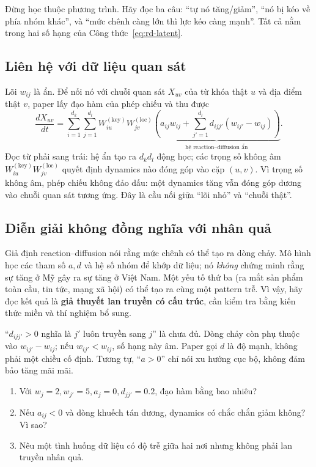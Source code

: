 \begin{plainwords}
Đừng học thuộc phương trình. Hãy đọc ba câu: ``tự nó tăng/giảm'', ``nó bị kéo về phía nhóm khác'',
và ``mức chênh càng lớn thì lực kéo càng mạnh''. Tất cả nằm trong hai số hạng của
Công thức~\eqref{eq:rd-latent}.
\end{plainwords}

\subsection{Liên hệ với dữ liệu quan sát}

Lõi $w_{ij}$ là ẩn. Để nối nó với chuỗi quan sát $X_{uv}$ của từ khóa thật $u$ và địa điểm thật
$v$, paper lấy đạo hàm của phép chiếu và thu được
\begin{equation}
  \frac{dX_{uv}}{dt}
  =\sum_{i=1}^{d_k}\sum_{j=1}^{d_l}
   W^{(\mathrm{key})}_{iu}W^{(\mathrm{loc})}_{jv}
   \underbrace{\left(
     a_{ij}w_{ij}+\sum_{j'=1}^{d_l}d_{ijj'}(w_{ij'}-w_{ij})
   \right)}_{\text{hệ reaction--diffusion ẩn}}.
  \label{eq:observed-derivative}
\end{equation}
Đọc từ phải sang trái: hệ ẩn tạo ra $d_k d_l$ động học; các trọng số không âm
$W^{(\mathrm{key})}_{iu}W^{(\mathrm{loc})}_{jv}$ quyết định dynamics nào đóng góp vào cặp
$(u,v)$. Vì trọng số không âm, phép chiếu không đảo dấu: một dynamics tăng vẫn đóng góp dương
vào chuỗi quan sát tương ứng. Đây là cầu nối giữa ``lõi nhỏ'' và ``chuỗi thật''.

\subsection{Diễn giải không đồng nghĩa với nhân quả}

Giả định reaction--diffusion nói rằng mức chênh có thể tạo ra dòng chảy. Mô hình học các tham số
$a,d$ và hệ số nhóm để khớp dữ liệu; nó \emph{không} chứng minh rằng sự tăng ở Mỹ gây ra sự tăng
ở Việt Nam. Một yếu tố thứ ba (ra mắt sản phẩm toàn cầu, tin tức, mạng xã hội) có thể tạo ra cùng
một pattern trễ. Vì vậy, hãy đọc kết quả là \textbf{giả thuyết lan truyền có cấu trúc}, cần kiểm
tra bằng kiến thức miền và thí nghiệm bổ sung.

\begin{commonmistake}
``$d_{ijj'}>0$ nghĩa là $j'$ luôn truyền sang $j$'' là chưa đủ. Dòng chảy còn phụ thuộc vào
$w_{ij'}-w_{ij}$; nếu $w_{ij'}<w_{ij}$, số hạng này âm. Paper gọi $d$ là độ mạnh, không phải một
chiều cố định. Tương tự, ``$a>0$'' chỉ nói xu hướng cục bộ, không đảm bảo tăng mãi mãi.
\end{commonmistake}

\begin{selfcheck}
\begin{enumerate}
  \item Với $w_j=2,w_{j'}=5,a_j=0,d_{jj'}=0.2$, đạo hàm bằng bao nhiêu?
  \item Nếu $a_{ij}<0$ và dòng khuếch tán dương, dynamics có chắc chắn giảm không? Vì sao?
  \item Nêu một tình huống dữ liệu có độ trễ giữa hai nơi nhưng không phải lan truyền nhân quả.
\end{enumerate}
\end{selfcheck}
